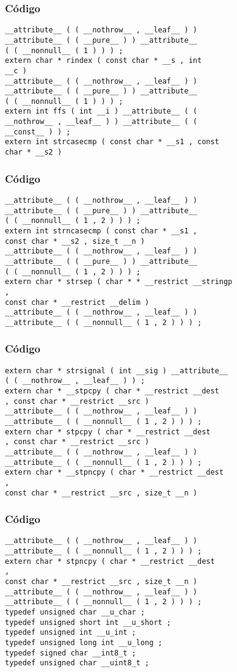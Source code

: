 \documentclass{beamer}
\begin{document}
\begin{frame}[fragile]
\frametitle{C\'odigo}
\begin{verbatim}
__attribute__ ( ( __nothrow__ , __leaf__ ) ) 
__attribute__ ( ( __pure__ ) ) __attribute__ 
( ( __nonnull__ ( 1 ) ) ) ; 
extern char * rindex ( const char * __s , int 
__c ) 
__attribute__ ( ( __nothrow__ , __leaf__ ) ) 
__attribute__ ( ( __pure__ ) ) __attribute__ 
( ( __nonnull__ ( 1 ) ) ) ; 
extern int ffs ( int __i ) __attribute__ ( ( 
__nothrow__ , __leaf__ ) ) __attribute__ ( ( 
__const__ ) ) ; 
extern int strcasecmp ( const char * __s1 , const 
char * __s2 ) 
\end{verbatim}
\end{frame}
\begin{frame}[fragile]
\frametitle{C\'odigo}
\begin{verbatim}
__attribute__ ( ( __nothrow__ , __leaf__ ) ) 
__attribute__ ( ( __pure__ ) ) __attribute__ 
( ( __nonnull__ ( 1 , 2 ) ) ) ; 
extern int strncasecmp ( const char * __s1 , 
const char * __s2 , size_t __n ) 
__attribute__ ( ( __nothrow__ , __leaf__ ) ) 
__attribute__ ( ( __pure__ ) ) __attribute__ 
( ( __nonnull__ ( 1 , 2 ) ) ) ; 
extern char * strsep ( char * * __restrict __stringp 
, 
const char * __restrict __delim ) 
__attribute__ ( ( __nothrow__ , __leaf__ ) ) 
__attribute__ ( ( __nonnull__ ( 1 , 2 ) ) ) ; 
\end{verbatim}
\end{frame}
\begin{frame}[fragile]
\frametitle{C\'odigo}
\begin{verbatim}
extern char * strsignal ( int __sig ) __attribute__ 
( ( __nothrow__ , __leaf__ ) ) ; 
extern char * __stpcpy ( char * __restrict __dest 
, const char * __restrict __src ) 
__attribute__ ( ( __nothrow__ , __leaf__ ) ) 
__attribute__ ( ( __nonnull__ ( 1 , 2 ) ) ) ; 
extern char * stpcpy ( char * __restrict __dest 
, const char * __restrict __src ) 
__attribute__ ( ( __nothrow__ , __leaf__ ) ) 
__attribute__ ( ( __nonnull__ ( 1 , 2 ) ) ) ; 
extern char * __stpncpy ( char * __restrict __dest 
, 
const char * __restrict __src , size_t __n ) 
\end{verbatim}
\end{frame}
\begin{frame}[fragile]
\frametitle{C\'odigo}
\begin{verbatim}
__attribute__ ( ( __nothrow__ , __leaf__ ) ) 
__attribute__ ( ( __nonnull__ ( 1 , 2 ) ) ) ; 
extern char * stpncpy ( char * __restrict __dest 
, 
const char * __restrict __src , size_t __n ) 
__attribute__ ( ( __nothrow__ , __leaf__ ) ) 
__attribute__ ( ( __nonnull__ ( 1 , 2 ) ) ) ; 
typedef unsigned char __u_char ; 
typedef unsigned short int __u_short ; 
typedef unsigned int __u_int ; 
typedef unsigned long int __u_long ; 
typedef signed char __int8_t ; 
typedef unsigned char __uint8_t ; 
\end{verbatim}
\end{frame}
\end{document}
